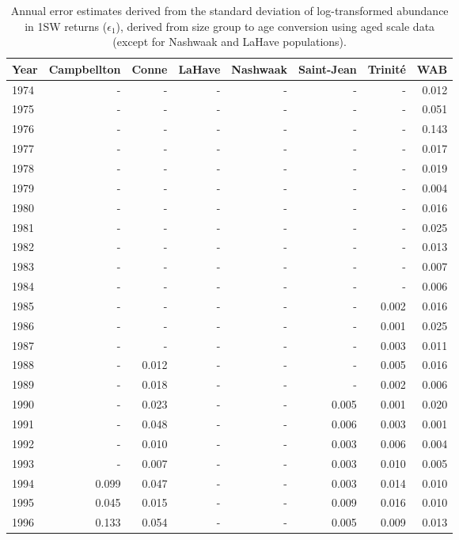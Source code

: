 \begingroup\footnotesize
\begin{longtable}{lrrrrrrr}
\caption{Annual error estimates derived from the standard deviation of log-transformed abundance 
                    in 1SW returns ($\epsilon_{1}$), derived from size group to age conversion using aged scale data 
                    (except for Nashwaak and LaHave populations).} \\ 
  \hline
Year & Campbellton & Conne & LaHave & Nashwaak & Saint-Jean & Trinité & WAB \\ 
  \hline
1974 & - & - & - & - & - & - & 0.012 \\ 
  1975 & - & - & - & - & - & - & 0.051 \\ 
  1976 & - & - & - & - & - & - & 0.143 \\ 
  1977 & - & - & - & - & - & - & 0.017 \\ 
  1978 & - & - & - & - & - & - & 0.019 \\ 
  1979 & - & - & - & - & - & - & 0.004 \\ 
  1980 & - & - & - & - & - & - & 0.016 \\ 
  1981 & - & - & - & - & - & - & 0.025 \\ 
  1982 & - & - & - & - & - & - & 0.013 \\ 
  1983 & - & - & - & - & - & - & 0.007 \\ 
  1984 & - & - & - & - & - & - & 0.006 \\ 
  1985 & - & - & - & - & - & 0.002 & 0.016 \\ 
  1986 & - & - & - & - & - & 0.001 & 0.025 \\ 
  1987 & - & - & - & - & - & 0.003 & 0.011 \\ 
  1988 & - & 0.012 & - & - & - & 0.005 & 0.016 \\ 
  1989 & - & 0.018 & - & - & - & 0.002 & 0.006 \\ 
  1990 & - & 0.023 & - & - & 0.005 & 0.001 & 0.020 \\ 
  1991 & - & 0.048 & - & - & 0.006 & 0.003 & 0.001 \\ 
  1992 & - & 0.010 & - & - & 0.003 & 0.006 & 0.004 \\ 
  1993 & - & 0.007 & - & - & 0.003 & 0.010 & 0.005 \\ 
  1994 & 0.099 & 0.047 & - & - & 0.003 & 0.014 & 0.010 \\ 
  1995 & 0.045 & 0.015 & - & - & 0.009 & 0.016 & 0.010 \\ 
  1996 & 0.133 & 0.054 & - & - & 0.005 & 0.009 & 0.013 \\ 

\end{longtable}
